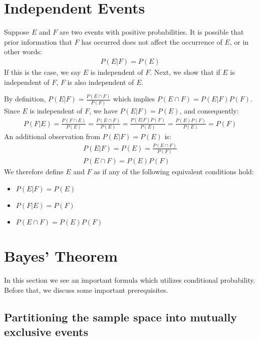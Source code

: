 \section{Independent Events}

Suppose \( E \) and \( F \) are two events with positive probabilities.
It is possible that prior information that \( F \) has occurred does not affect the occurrence of \( E \), or in other words:
\begin{align*}
	P(E | F) = P(E)
\end{align*}
If this is the case, we say \( E \) is independent of \( F \).
Next, we show that if \( E \) is independent of \( F \), \( F \) is also independent of \( E \).

By definition, \( P(E | F) = \frac{P(E \cap F)}{P(F)} \) which implies \( P(E \cap F) = P(E | F)P(F) \).
Since \( E \) is independent of \( F \), we have \( P(E | F) = P(E) \), and consequently:
\begin{align*}
	P(F | E) = \frac{P(F \cap E)}{P(E)} = \frac{P(E \cap F)}{P(E)} = \frac{P(E | F)P(F)}{P(E)} = \frac{P(E)P(F)}{P(E)} = P(F)
\end{align*}
An additional observation from \( P(E | F) = P(E) \) is:
\begin{gather*}
	P(E | F) = P(E) = \frac{P(E \cap F)}{P(F)}\\
	P(E \cap F) = P(E)P(F)
\end{gather*}
We therefore define \( E \) and \( F \) as  if any of the following equivalent conditions hold:
\begin{itemize}
	\item \( P(E | F) = P(E) \)
	\item \( P(F | E) = P(F) \)
	\item \( P(E \cap F) = P(E)P(F) \)
\end{itemize}

\section{Bayes' Theorem}

In this section we see an important formula which utilizes conditional probability.
Before that, we discuss some important prerequisites.

\subsection{Partitioning the sample space into mutually exclusive events}


